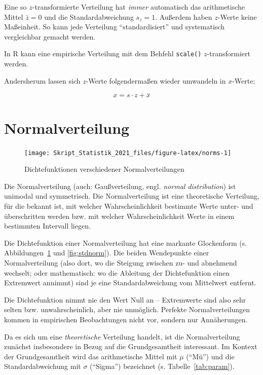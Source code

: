 \documentclass[
  11pt,
  ngerman,
  a4paper,
]{report}
\newenvironment{rtip}{
  \medskip
  \begin{tcolorbox}[colframe=purple,colback=light_gray,title=Softwarehinweis]
}{
  \end{tcolorbox}
  \medskip
}
\begin{document}
Eine so \(z\)-transformierte Verteilung hat \emph{immer} automatisch das arithmetische Mittel \(\bar{z}=0\) und die Standardabweichung \(s_z=1\). Außerdem haben \(z\)-Werte keine Maßeinheit. So kann jede Verteilung \enquote{standardisiert} und systematisch vergleichbar gemacht werden.

\begin{rtip}
In R kann eine empirische Verteilung mit dem Behfehl \verb|scale()| $z$-transformiert werden.
\end{rtip}

Andersherum lassen sich \(z\)-Werte folgendermaßen wieder umwandeln in \(x\)-Werte:

\[
  x=s\cdot z+\bar{x}
  \label{eq:zrev}
\]

\hypertarget{normalverteilung}{%
\section{Normalverteilung}\label{normalverteilung}}

\begin{figure}[b]

{\centering \texttt{[image: Skript\_Statistik\_2021\_files/figure-latex/norms-1]} 

}

\caption{Dichtefunktionen verschiedener Normalverteilungen}\label{fig:norms}
\end{figure}

Die Normalverteilung (auch: Gaußverteilung, engl. \emph{normal distribution}) ist unimodal und symmetrisch. Die Normalverteilung ist eine theoretische Verteilung, für die bekannt ist, mit welcher Wahrscheinlichkeit bestimmte Werte unter- und überschritten werden bzw. mit welcher Wahrscheinlichkeit Werte in einem bestimmten Intervall liegen.

Die Dichtefunktion einer Normalverteilung hat eine markante Glockenform (s. Abbildungen~\ref{fig:norms} und \ref{fig:stdnorm}). Die beiden Wendepunkte einer Normalverteilung (also dort, wo die Steigung zwischen zu- und abnehmend wechselt; oder mathematisch: wo die Ableitung der Dichtefunktion einen Extremwert annimmt) sind je eine Standardabweichung vom Mittelwert entfernt.

Die Dichtefunktion nimmt nie den Wert Null an -- Extremwerte sind also sehr selten bzw. unwahrscheinlich, aber nie unmöglich. Perfekte Normalverteilungen kommen in empirischen Beobachtungen nicht vor, sondern nur Annäherungen.

Da es sich um eine \emph{theoretische} Verteilung handelt, ist die Normalverteilung zunächst insbesondere in Bezug auf die Grundgesamtheit interessant. Im Kontext der Grundgesamtheit wird das arithmetische Mittel mit \(\mu\) (\enquote{Mü}) und die Standardabweichung mit \(\sigma\) (\enquote{Sigma}) bezeichnet (s. Tabelle~\ref{tab:param}).
\end{document}
